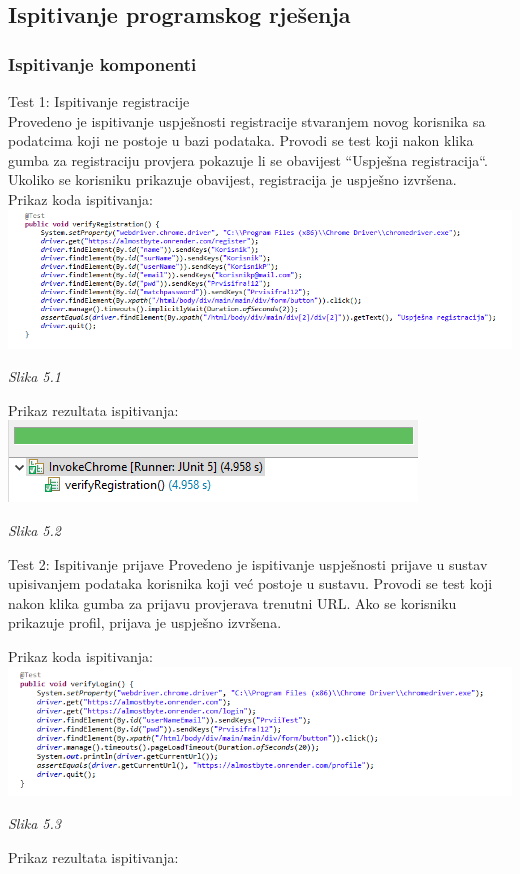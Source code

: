 \documentclass{article}
\begin{document}
	\subsection{Ispitivanje programskog rješenja}
	\subsubsection{Ispitivanje komponenti}
	Test 1: Ispitivanje registracije\\
	Provedeno je ispitivanje uspješnosti registracije stvaranjem novog korisnika sa podatcima koji ne postoje u bazi podataka.  Provodi se test koji nakon klika gumba za registraciju provjera pokazuje li se obavijest “Uspješna registracija“. Ukoliko se korisniku prikazuje obavijest, registracija je uspješno izvršena.\\
	Prikaz koda ispitivanja:\\
	
	\includegraphics[width=\columnwidth]{registration}
	\begin{center}
		\textit{Slika 5.1}
	\end{center}
	Prikaz rezultata ispitivanja:\\
	
	\includegraphics[width=\columnwidth]{registration-true}
	\begin{center}
		\textit{Slika 5.2}
	\end{center}
	\eject
	Test 2: Ispitivanje prijave
	Provedeno je ispitivanje uspješnosti prijave u sustav upisivanjem podataka korisnika koji već postoje u sustavu. Provodi se test koji nakon klika gumba za prijavu provjerava trenutni URL. Ako se korisniku prikazuje profil, prijava je uspješno izvršena.
	
	Prikaz koda ispitivanja:\\
	
	\includegraphics[width=\columnwidth]{login_}
	\begin{center}
		\textit{Slika 5.3}
	\end{center}
	Prikaz rezultata ispitivanja:\\
	
\end{document}

